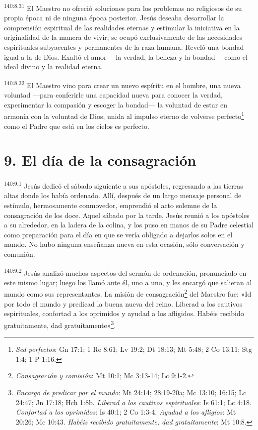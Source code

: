 \par
\textsuperscript{140:8.31} El Maestro no ofreció soluciones para los problemas no religiosos de su propia época ni de ninguna época posterior. Jesús deseaba desarrollar la comprensión espiritual de las realidades eternas y estimular la iniciativa en la originalidad de la manera de vivir; se ocupó exclusivamente de las necesidades espirituales subyacentes y permanentes de la raza humana. Reveló una bondad igual a la de Dios. Exaltó el amor ---la verdad, la belleza y la bondad--- como el ideal divino y la realidad eterna.

\par
\textsuperscript{140:8.32} El Maestro vino para crear un nuevo espíritu en el hombre, una nueva voluntad ---para conferirle una capacidad nueva para conocer la verdad, experimentar la compasión y escoger la bondad--- la voluntad de estar en armonía con la voluntad de Dios, unida al impulso eterno de volverse perfecto\footnote{\textit{Sed perfectos}: Gn 17:1; 1 Re 8:61; Lv 19:2; Dt 18:13; Mt 5:48; 2 Co 13:11; Stg 1:4; 1 P 1:16.} como el Padre que está en los cielos es perfecto.

\section*{9. El día de la consagración}
\par
\textsuperscript{140:9.1} Jesús dedicó el sábado siguiente a sus apóstoles, regresando a las tierras altas donde los había ordenado. Allí, después de un largo mensaje personal de estímulo, hermosamente conmovedor, emprendió el acto solemne de la consagración de los doce. Aquel sábado por la tarde, Jesús reunió a los apóstoles a su alrededor, en la ladera de la colina, y los puso en manos de su Padre celestial como preparación para el día en que se vería obligado a dejarlos solos en el mundo. No hubo ninguna enseñanza nueva en esta ocasión, sólo conversación y comunión.

\par
\textsuperscript{140:9.2} Jesús analizó muchos aspectos del sermón de ordenación, pronunciado en este mismo lugar; luego los llamó ante él, uno a uno, y les encargó que salieran al mundo como sus representantes. La misión de consagración\footnote{\textit{Consagración y comisión}: Mt 10:1; Mc 3:13-14; Lc 9:1-2.} del Maestro fue: «Id por todo el mundo y predicad la buena nueva del reino. Liberad a los cautivos espirituales, confortad a los oprimidos y ayudad a los afligidos. Habéis recibido gratuitamente, dad gratuitamente»\footnote{\textit{Encargo de predicar por el mundo}: Mt 24:14; 28:19-20a; Mc 13:10; 16:15; Lc 24:47; Jn 17:18; Hch 1:8b. \textit{Liberad a los cautivos espirituales}: Is 61:1; Lc 4:18. \textit{Confortad a los oprimidos}: Is 40:1; 2 Co 1:3-4. \textit{Ayudad a los afligios}: Mt 20:26; Mc 10:43. \textit{Habéis recibido gratuitamente, dad gratuitamente}: Mt 10:8.}.

